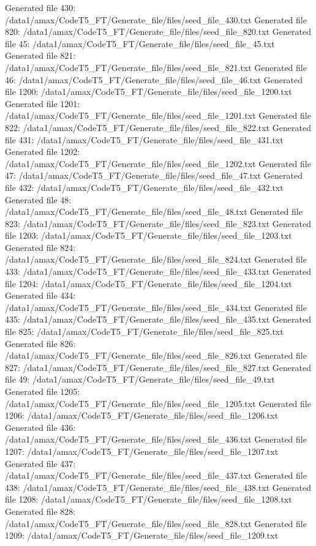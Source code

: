 Generated file 430: /data1/amax/CodeT5_FT/Generate_file/files/seed_file_430.txt
Generated file 820: /data1/amax/CodeT5_FT/Generate_file/files/seed_file_820.txt
Generated file 45: /data1/amax/CodeT5_FT/Generate_file/files/seed_file_45.txt
Generated file 821: /data1/amax/CodeT5_FT/Generate_file/files/seed_file_821.txt
Generated file 46: /data1/amax/CodeT5_FT/Generate_file/files/seed_file_46.txt
Generated file 1200: /data1/amax/CodeT5_FT/Generate_file/files/seed_file_1200.txt
Generated file 1201: /data1/amax/CodeT5_FT/Generate_file/files/seed_file_1201.txt
Generated file 822: /data1/amax/CodeT5_FT/Generate_file/files/seed_file_822.txt
Generated file 431: /data1/amax/CodeT5_FT/Generate_file/files/seed_file_431.txt
Generated file 1202: /data1/amax/CodeT5_FT/Generate_file/files/seed_file_1202.txt
Generated file 47: /data1/amax/CodeT5_FT/Generate_file/files/seed_file_47.txt
Generated file 432: /data1/amax/CodeT5_FT/Generate_file/files/seed_file_432.txt
Generated file 48: /data1/amax/CodeT5_FT/Generate_file/files/seed_file_48.txt
Generated file 823: /data1/amax/CodeT5_FT/Generate_file/files/seed_file_823.txt
Generated file 1203: /data1/amax/CodeT5_FT/Generate_file/files/seed_file_1203.txt
Generated file 824: /data1/amax/CodeT5_FT/Generate_file/files/seed_file_824.txt
Generated file 433: /data1/amax/CodeT5_FT/Generate_file/files/seed_file_433.txt
Generated file 1204: /data1/amax/CodeT5_FT/Generate_file/files/seed_file_1204.txt
Generated file 434: /data1/amax/CodeT5_FT/Generate_file/files/seed_file_434.txt
Generated file 435: /data1/amax/CodeT5_FT/Generate_file/files/seed_file_435.txt
Generated file 825: /data1/amax/CodeT5_FT/Generate_file/files/seed_file_825.txt
Generated file 826: /data1/amax/CodeT5_FT/Generate_file/files/seed_file_826.txt
Generated file 827: /data1/amax/CodeT5_FT/Generate_file/files/seed_file_827.txt
Generated file 49: /data1/amax/CodeT5_FT/Generate_file/files/seed_file_49.txt
Generated file 1205: /data1/amax/CodeT5_FT/Generate_file/files/seed_file_1205.txt
Generated file 1206: /data1/amax/CodeT5_FT/Generate_file/files/seed_file_1206.txt
Generated file 436: /data1/amax/CodeT5_FT/Generate_file/files/seed_file_436.txt
Generated file 1207: /data1/amax/CodeT5_FT/Generate_file/files/seed_file_1207.txt
Generated file 437: /data1/amax/CodeT5_FT/Generate_file/files/seed_file_437.txt
Generated file 438: /data1/amax/CodeT5_FT/Generate_file/files/seed_file_438.txt
Generated file 1208: /data1/amax/CodeT5_FT/Generate_file/files/seed_file_1208.txt
Generated file 828: /data1/amax/CodeT5_FT/Generate_file/files/seed_file_828.txt
Generated file 1209: /data1/amax/CodeT5_FT/Generate_file/files/seed_file_1209.txt
